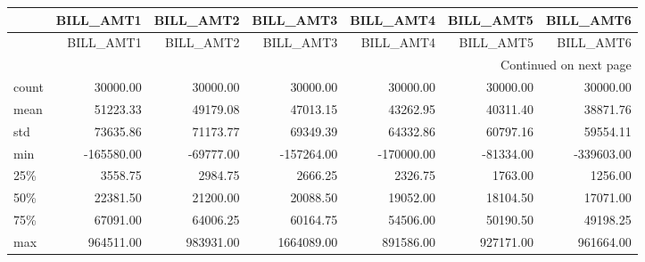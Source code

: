 \begin{longtable}{lrrrrrr}
\toprule
{} &  BILL\_AMT1 &  BILL\_AMT2 &  BILL\_AMT3 &  BILL\_AMT4 &  BILL\_AMT5 &  BILL\_AMT6 \\
\midrule
\endfirsthead

\toprule
{} &  BILL\_AMT1 &  BILL\_AMT2 &  BILL\_AMT3 &  BILL\_AMT4 &  BILL\_AMT5 &  BILL\_AMT6 \\
\midrule
\endhead
\midrule
\multicolumn{7}{r}{{Continued on next page}} \\
\midrule
\endfoot

\bottomrule
\endlastfoot
count &   30000.00 &   30000.00 &   30000.00 &   30000.00 &   30000.00 &   30000.00 \\
mean  &   51223.33 &   49179.08 &   47013.15 &   43262.95 &   40311.40 &   38871.76 \\
std   &   73635.86 &   71173.77 &   69349.39 &   64332.86 &   60797.16 &   59554.11 \\
min   & -165580.00 &  -69777.00 & -157264.00 & -170000.00 &  -81334.00 & -339603.00 \\
25\%   &    3558.75 &    2984.75 &    2666.25 &    2326.75 &    1763.00 &    1256.00 \\
50\%   &   22381.50 &   21200.00 &   20088.50 &   19052.00 &   18104.50 &   17071.00 \\
75\%   &   67091.00 &   64006.25 &   60164.75 &   54506.00 &   50190.50 &   49198.25 \\
max   &  964511.00 &  983931.00 & 1664089.00 &  891586.00 &  927171.00 &  961664.00 \\
\end{longtable}
